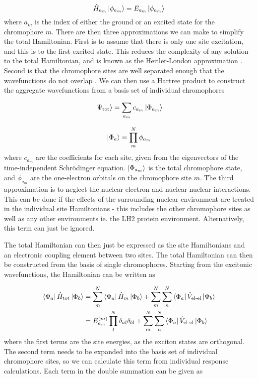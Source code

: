 \begin{equation}
\hat{H}_{a_m} \ket{\phi_{a_m}} = E_{a_m} \ket{\phi_{a_m}}
\end{equation}
%
where ${a_m}$ is the index of either the ground or an excited state for the chromophore
$m$. There are then three approximations we can make to simplify the total Hamiltonian.
First is to assume that there is only one site excitation, and this is to the first
excited state. This reduces the complexity of any solution to the total Hamiltonian,
and is known as the Heitler-London approximation \cite{Agranovich2000}. Second is 
that the chromophore sites are well separated enough that the wavefunctions do not
overlap \cite{Frenkel1931}. We can then use a Hartree product to construct the aggregate
wavefunctions from a basis set of individual chromophores

\begin{equation}
\ket{\Psi_\text{tot}} = \sum_{a_m} c_{a_m} \ket{\Phi_{a_m}}
\end{equation}

\begin{equation}
\ket{\Phi_a} = \prod^N_m \phi_{a_m}
\end{equation}
%
where $c_{a_m}$ are the coefficients for each site, given from the eigenvectors 
of the time-independent Schr\"{o}dinger equation. $\ket{\Phi_{a_m}}$ is the total chromophore
state, and $\phi_{a_m}$ are the one-electron orbitals on the chromophore site $m$.
The third approximation is to neglect the nuclear-electron and nuclear-nuclear interactions.
This can be done if the effects of the surrounding nuclear environment are treated
in the individual site Hamiltonians \cite{Scholes2003} - this includes the other 
chromophore sites as well as any other environments ie. the LH2 protein environment.
Alternatively, this term can just be ignored.

The total Hamiltonian can then just be expressed as the site Hamiltonians and an 
electronic coupling element between two sites. The total Hamiltonian can then be
constructed from the basis of single chromophores. Starting from the excitonic wavefunctions,
the Hamiltonian can be written as

\begin{equation}
\begin{aligned}
\bra{\Phi_a} \hat{H}_{\text{tot}}\ket{\Phi_b} &= \sum^N_m \bra{\Phi_a} \hat{H}_{m}\ket{\Phi_b} + \sum^N_m \sum^N_n \bra{\Phi_a} \hat{V}_{\text{el-el}}\ket{\Phi_b} \\
&= E^{\left(m\right)}_{a_m} \prod^N_l \delta_{al} \delta_{bl} + \sum^N_m \sum^N_n \bra{\Phi_a} \hat{V}_{\text{el-el}}\ket{\Phi_b}
\end{aligned}
\end{equation}
%
where the first terms are the site energies, as the exciton states are orthogonal. 
The second term needs to be expanded into the basis set of individual chromophore 
sites, so we can calculate this term from individual response calculations. Each 
term in the double summation can be given as

